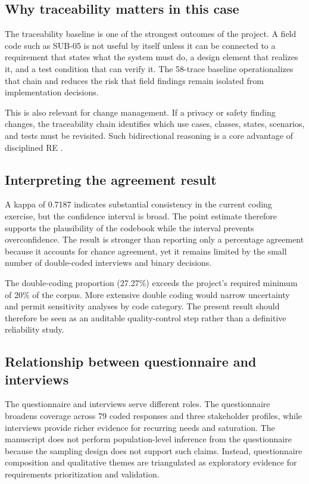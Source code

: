 \documentclass[10pt,a4paper]{article}
\begin{document}
\subsection{Why traceability matters in this case}
The traceability baseline is one of the strongest outcomes of the project. A field code such as SUB-05 is not useful by itself unless it can be connected to a requirement that states what the system must do, a design element that realizes it, and a test condition that can verify it. The 58-trace baseline operationalizes that chain and reduces the risk that field findings remain isolated from implementation decisions.

This is also relevant for change management. If a privacy or safety finding changes, the traceability chain identifies which use cases, classes, states, scenarios, and tests must be revisited. Such bidirectional reasoning is a core advantage of disciplined RE \citep{pohl2010requirements,iso29148_2018}.

\subsection{Interpreting the agreement result}
A kappa of 0.7187 indicates substantial consistency in the current coding exercise, but the confidence interval is broad. The point estimate therefore supports the plausibility of the codebook while the interval prevents overconfidence. The result is stronger than reporting only a percentage agreement because it accounts for chance agreement, yet it remains limited by the small number of double-coded interviews and binary decisions.

The double-coding proportion (27.27\%) exceeds the project's required minimum of 20\% of the corpus. More extensive double coding would narrow uncertainty and permit sensitivity analyses by code category. The present result should therefore be seen as an auditable quality-control step rather than a definitive reliability study.

\subsection{Relationship between questionnaire and interviews}
The questionnaire and interviews serve different roles. The questionnaire broadens coverage across 79 coded responses and three stakeholder profiles, while interviews provide richer evidence for recurring needs and saturation. The manuscript does not perform population-level inference from the questionnaire because the sampling design does not support such claims. Instead, questionnaire composition and qualitative themes are triangulated as exploratory evidence for requirements prioritization and validation.
\end{document}
